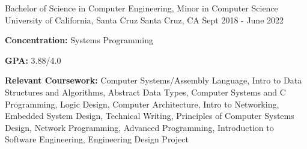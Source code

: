 
\begin{cventries}
  \cventry
    {Bachelor of Science in Computer Engineering, Minor in Computer Science} %
    {University of California, Santa Cruz} %
    {Santa Cruz, CA} %
    {Sept 2018 - June 2022} %
    {
    \begin{cvitems}
        \item {\textbf{Concentration:} Systems Programming}
        \vspace{0.5mm}
        \item {\textbf{GPA:} 3.88/4.0}
        \item {\textbf{Relevant Coursework:} Computer Systems/Assembly Language, Intro to Data Structures and Algorithms, Abstract Data Types, Computer Systems and C Programming, Logic Design, Computer Architecture, Intro to Networking, Embedded System Design, %
        Technical Writing, Principles of Computer Systems Design, Network Programming, Advanced Programming, Introduction to Software Engineering, Engineering Design Project}
    \end{cvitems}
    }
\end{cventries}
